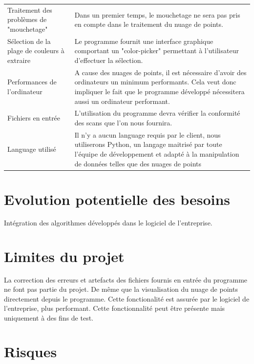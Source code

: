 \documentclass[12pt,titlepage,french]{article}
\begin{document}
\noindent\begin{tabu} to \textwidth {X[c]X[c3]}\toprule
     &\\\toprule
Traitement des problèmes de "mouchetage"
& Dans un premier temps, le mouchetage ne sera pas pris en compte dans le traitement du nuage de points.
\\\midrule
Sélection de la plage de couleurs à extraire 
& Le programme fournit une interface graphique comportant un "color-picker" permettant à l'utilisateur d'effectuer la sélection.\\\midrule
Performances de l'ordinateur
& A cause des nuages de points, il est nécessaire d'avoir des ordinateurs un minimum performants. Cela veut donc impliquer le fait que le programme développé nécessitera aussi un ordinateur performant.\\\midrule
Fichiers en entrée
& L'utilisation du programme devra vérifier la conformité des scans que l'on nous fournira.\\\midrule
Language utilisé
& Il n'y a aucun language requis par le client, nous utiliserons Python, un langage maitrisé par toute l'équipe de développement et adapté à la manipulation de données telles que des nuages de points\\\bottomrule
\end{tabu}

\section{Evolution potentielle des besoins}

Intégration des algorithmes développés dans le logiciel de l'entreprise.


\section{Limites du projet}

La correction des erreurs et artefacts des fichiers fournis en entrée du programme ne font pas partie du projet.
De même que la visualisation du nuage de points directement depuis le programme. Cette fonctionalité est assurée par le logiciel de l'entreprise, plus performant. Cette fonctionnalité peut être présente mais uniquement à des fins de test.

\section{Risques}
\end{document}

